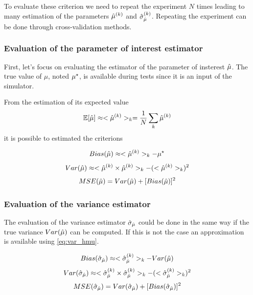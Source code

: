To evaluate these criterion we need to repeat the experiment $N$ times leading to many estimation of the parameters $\hat\mu^{(k)}$ and $\hat\sigma_{\hat\mu}^{(k)}$.
Repeating the experiment can be done through cross-validation methods.







\subsubsection{Evaluation of the parameter of interest estimator} %
\label{ssub:evaluation_of_the_parameter_of_interest_estimator}

First, let's focus on evaluating the estimator of the parameter of insterest $\hat\mu$.
The true value of $\mu$, noted $\mu^\star$, is available during tests since it is an input of the simulator.

From the estimation of its expected value
\begin{equation}
  \mathbb{E}[\hat\mu] \approx <\hat\mu^{(k)}>_k = \frac{1}{N} \sum_{k} \hat\mu^{(k)}
\end{equation}
it is possible to estimated the criterions

\begin{equation}
  Bias(\hat\mu) \approx <\hat\mu^{(k)}>_k - \mu^\star
\end{equation}
\begin{equation}
  \label{eq:var_hmu}
  Var(\hat\mu) \approx <\hat\mu^{(k)} \times \hat\mu^{(k)}>_k - (<\hat\mu^{(k)}>_k)^2
\end{equation}
\begin{equation}
  MSE(\hat\mu) = Var(\hat\mu) + [Bias(\hat\mu)]^2
\end{equation}






\subsubsection{Evaluation of the variance estimator} %
\label{ssub:evaluation_of_the_variance_estimator}


The evaluation of the variance estimator $\hat\sigma_{\hat\mu}$ could be done in the same way if the true variance $Var(\hat\mu)$ can be computed.
If this is not the case an approximation is available using \autoref{eq:var_hmu}.

\begin{equation}
  Bias(\hat\sigma_{\hat\mu}) \approx <\hat\sigma_{\hat\mu}^{(k)}>_k - Var(\hat\mu)
\end{equation}
\begin{equation}
  Var(\hat\sigma_{\hat\mu}) \approx <\hat\sigma_{\hat\mu}^{(k)} \times \hat\sigma_{\hat\mu}^{(k)}>_k - (<\hat\sigma_{\hat\mu}^{(k)}>_k)^2
\end{equation}
\begin{equation}
  MSE(\hat\sigma_{\hat\mu}) = Var(\hat\sigma_{\hat\mu}) + [Bias(\hat\sigma_{\hat\mu})]^2
\end{equation}







